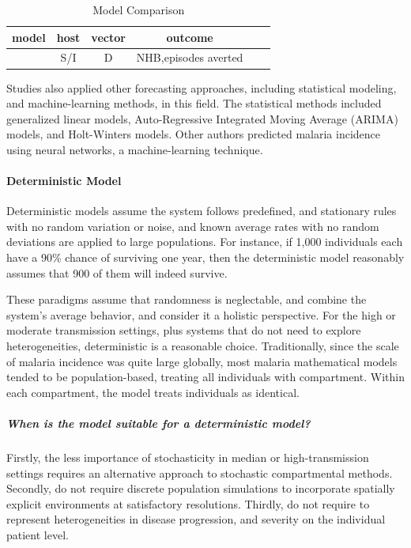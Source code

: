 \documentclass[a4paper, 12pt, twoside]{article}
\begin{document}
\begin{table}[htpb]
  \centering
  \caption{Model Comparison}
  \label{tab:model_comparison}
  \begin{tabular}{cccccc}
  \toprule
  model & host & vector & outcome &  & \\
  \midrule
  \cite{Briet2013} & S/I & D & NHB,episodes averted & & \\
  \bottomrule
  \end{tabular}
\end{table}

Studies also applied other forecasting approaches, including statistical modeling, and machine-learning methods, in this field.
The statistical methods included generalized linear models, Auto-Regressive Integrated Moving Average (ARIMA) models\cite{box2015time,Anokye2018}, and Holt-Winters models\cite{Chatfield1978}.
Other authors\cite{Toh2021a,Libbrecht2015,Nkiruka2021,Verma2020,Kim2019,Khameneh2014,Ebhuoma2018,Hancock2020} predicted malaria incidence using neural networks, a machine-learning technique.

\paragraph{Deterministic Model}%
\label{par:deterministic_model}

Deterministic models assume the system follows predefined, and stationary rules with no random variation or noise, and known average rates with no random deviations are applied to large populations.
For instance, if 1,000 individuals each have a 90\% chance of surviving one year, then the deterministic model reasonably assumes that 900 of them will indeed survive.

These paradigms assume that randomness is neglectable, and combine the system’s average behavior, and consider it a holistic perspective.
For the high or moderate transmission settings, plus systems that do not need to explore heterogeneities, deterministic is a reasonable choice.
Traditionally, since the scale of malaria incidence was quite large globally, most malaria mathematical models tended to be population-based, treating all individuals with compartment.
Within each compartment, the model treats individuals as identical.

\subparagraph{When is the model suitable for a deterministic model?}%
\label{par:when_the_model_is_suitable_for_deterministic_model_}
Firstly, the less importance of stochasticity in median or high-transmission settings requires an alternative approach to stochastic compartmental methods.
Secondly, do not require discrete population simulations to incorporate spatially explicit environments at satisfactory resolutions.
Thirdly, do not require to represent heterogeneities in disease progression, and severity on the individual patient level.
\end{document}
